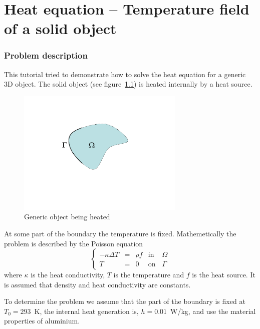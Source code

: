 \chapter{Heat equation -- Temperature field of a solid object}


\subsection*{Problem description}

This tutorial tried to demonstrate how to solve the heat equation 
for a generic 3D object. The solid object 
(see figure~\ref{fg:object1}) is heated internally by a heat source.
\begin{figure}
\begin{center}
\includegraphics[width=80mm, viewport=100 100 760 520,clip]{domain}
\caption{Generic object being heated}\label{fg:object1}
\end{center}
\end{figure}
At some part of the boundary the temperature is fixed.
Mathemetically the problem is described by the Poisson equation
\begin{equation}
\left \{
\begin{array}{ccccc}
- \kappa \Delta T &= &\rho f & \mathrm{ in } \, \, & \Omega \\
T&=&0 & \mathrm{ on } & \Gamma
\end{array}
\right .
\end{equation}
where $\kappa$ is the heat conductivity, $T$  is the temperature 
and $f$ is the heat source. It is assumed that density 
and heat conductivity are constants. 

To determine the problem we assume that the part of the boundary is fixed at $T_0=293$~K,
the internal heat generation is, $h=0.01$~W/kg, and use the material properties of aluminium.


